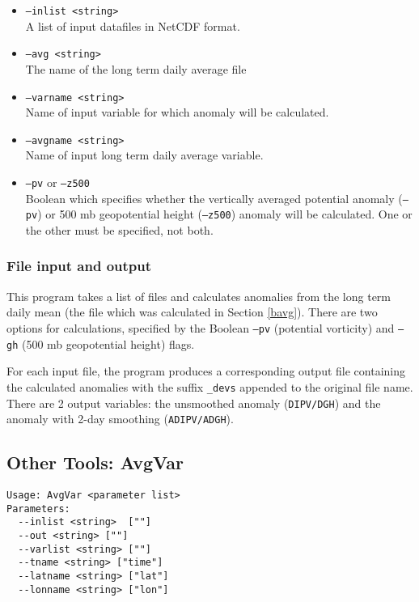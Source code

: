 \documentclass{article}
\begin{document}
\begin{itemize}
\item[]\texttt{--inlist <string>} \\ A list of input datafiles in NetCDF format. 
\item[] \texttt{--avg <string>}\\ The name of the long term daily average file 
\item[] \texttt{--varname <string>}\\Name of input variable for which anomaly will be calculated.
\item[]\texttt{--avgname <string>}\\Name of input long term daily average variable.
\item[]\texttt{--pv} or \texttt{--z500}\\Boolean which specifies whether the vertically averaged potential anomaly (\texttt{--pv}) or 500 mb geopotential height (\texttt{--z500}) anomaly will be calculated. One or the other must be specified, not both.
\end{itemize}

\subsubsection{File input and output}
This program takes a list of files and calculates anomalies from the long term daily mean (the file which was calculated in Section \ref{bavg}). There are two options for calculations, specified by the Boolean \texttt{--pv} (potential vorticity) and \texttt{--gh} (500 mb geopotential height) flags. 

For each input file, the program produces a corresponding output file containing the calculated anomalies with the suffix \texttt{\_devs} appended to the original file name. There are 2 output variables: the unsmoothed anomaly (\texttt{DIPV/DGH}) and  the anomaly with 2-day smoothing (\texttt{ADIPV/ADGH}).


\subsection{Other Tools: AvgVar}\label{avgvar}
\begin{verbatim}
Usage: AvgVar <parameter list>
Parameters:
  --inlist <string>  [""]
  --out <string> [""]
  --varlist <string> [""]
  --tname <string> ["time"]
  --latname <string> ["lat"]
  --lonname <string> ["lon"]
\end{verbatim}
\end{document}
